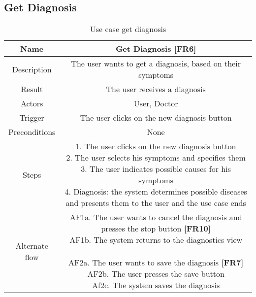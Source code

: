 \subsection{Get Diagnosis}
\begin{table}[H]
	\begin{center}\scriptsize
		\def\arraystretch{2}%
		\begin{tabular}{ |c|c| } 
			\hline
			Name & Get Diagnosis \textbf{[FR6]}\\
			\hline	
			Description & The user wants to get a diagnosis, based on their symptoms \\ 
			\hline
			Result & The user receives a diagnosis \\ 
			\hline
			Actors & User, Doctor \\ 
			\hline
			Trigger & The user clicks on the new diagnosis button \\ 
			\hline
			Preconditions & None \\ 
			\hline
			Steps & \parbox{9cm}{\vspace{.5\baselineskip}
				1. The user clicks on the new diagnosis button\\
				2. The user selects his symptoms and specifies them\\
				3. The user indicates possible causes for his symptoms\\
				4. Diagnosis: the system determines possible diseases and presents them to the user and the use case ends}\\
			\hline
			Alternate flow & \parbox{9cm}{
				AF1a. The user wants to cancel the diagnosis and presses the stop button \textbf{[FR10]}\\
				AF1b. The system returns to the diagnostics view\\\\
				AF2a. The user wants to save the diagnosis \textbf{[FR7]}\\
				AF2b. The user presses the save button\\
				Af2c. The system saves the diagnosis}\\ 
			\hline
		\end{tabular}\normalsize
	\end{center}
	\caption{Use case get diagnosis}
\end{table}


